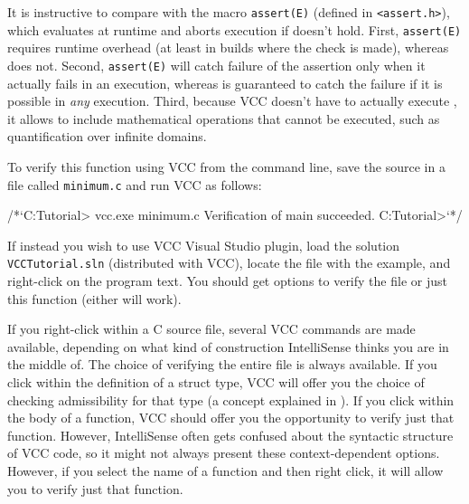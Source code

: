 \begin{note}
It is instructive to compare  with the macro
\lstinline|assert(E)| (defined in \lstinline|<assert.h>|), which
evaluates   at runtime and aborts execution if 
doesn't hold. First, \lstinline|assert(E)| requires runtime overhead (at least
in builds where the check is made), whereas  does
not. Second, \lstinline|assert(E)| will catch failure of the 
assertion only when it actually fails in an execution, whereas 
 is guaranteed to catch the failure if it is
possible in \emph{any} execution. Third, because VCC doesn't have to
actually execute , it allows  to include
mathematical operations that cannot be executed, such as
quantification over infinite domains.
\end{note}

To verify this function using VCC from the command line, save the source in a file called \lstinline|minimum.c|
and run VCC as follows:

\begin{VCC}
/*`C:\Somewhere\VCC Tutorial> vcc.exe minimum.c
Verification of main succeeded.
C:\Somewhere\VCC Tutorial>`*/
\end{VCC}

If instead you wish to use VCC Visual Studio plugin, load the solution \lstinline|VCCTutorial.sln|
(distributed with VCC), 
locate the file with the example, and right-click on the program text.
You should get options to verify the file or just this function (either will work).

\begin{note}
If you right-click within a C source file,
several VCC commands are made available, depending on what kind of
construction IntelliSense thinks you are in the middle of. The choice
of verifying the entire file is always available. If you click within
the definition of a struct type, VCC will offer you the choice of
checking admissibility for that type (a concept explained in ).
If you click within the body of a function, VCC should offer
you the opportunity to verify just that function. However,
IntelliSense often gets confused about the syntactic structure of
VCC code, so it might not always present these context-dependent
options. However, if you select the name of a function and then right
click, it will allow you to verify just that function.
\end{note}

